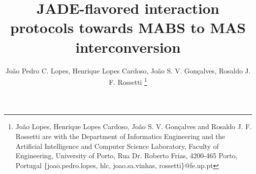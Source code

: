 
\title{\LARGE \bf
JADE-flavored interaction protocols towards MABS to MAS interconversion
}


\author{João Pedro C. Lopes,
	Henrique Lopes Cardoso,
	João S. V. Gonçalves,
	Rosaldo J. F. Rossetti  %
    \thanks{João Lopes, Henrique Lopes Cardoso,	João S. V. Gonçalves and Rosaldo J. F. Rossetti are
    	with the Department of Informatics Engineering and the Artificial
    	Intelligence and Computer Science Laboratory,
    	Faculty of Engineering,
    	University of Porto,
    	Rua Dr. Roberto Frias, 4200-465 Porto, Portugal
    	\{joao.pedro.lopes, hlc, joao.sa.vinhas, rossetti\}@fe.up.pt } %
}